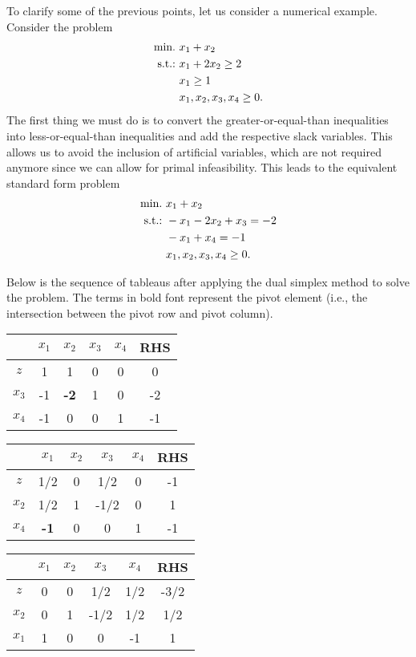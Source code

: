 To clarify some of the previous points, let us consider a numerical example. Consider the problem 
%
\begin{align*}
	\mathop{\text{min.~}} &x_1 + x_2 \\
	\mathop{\text{s.t.:~}} &x_1 + 2x_2 \geq 2 \\
	&x_1 \geq  1 \\
	&x_1,x_2,x_3,x_4 \geq 0.	
\end{align*}	
%
The first thing we must do is to convert the greater-or-equal-than inequalities into less-or-equal-than inequalities and add the respective slack variables. This allows us to avoid the inclusion of artificial variables, which are not required anymore since we can allow for primal infeasibility. This leads to the equivalent standard form problem
%
\begin{align*}
	\mathop{\text{min.~}} &x_1 + x_2 \\
	\mathop{\text{s.t.:~}} &-x_1 - 2x_2 + x_3 = -2 \\
	&-x_1 + x_4 = -1 \\
	&x_1,x_2,x_3,x_4 \geq 0.	
\end{align*}

Below is the sequence of tableaus after applying the dual simplex method to solve the problem. The terms in bold font represent the pivot element (i.e., the intersection between the pivot row and pivot column). 


\begin{center}
	\begin{tabular}{c|cccc|c}
		 & $x_1$ & $x_2$ & $x_3$ & $x_4$ & RHS \\ \hline 
		$z$  &  1 & 1 & 0 & 0 & 0  \\ \hline
	   $x_3$ & -1 &\textbf{-2} & 1 & 0 & -2 \\
	   $x_4$ & -1 & 0 & 0 & 1 & -1 \\\hline \hline
	\end{tabular}
	
	\begin{tabular}{c|cccc|c}
		 & $x_1$ & $x_2$ & $x_3$ & $x_4$ & RHS \\ \hline 
		$z$  & 1/2 & 0 & 1/2 & 0 & -1  \\ \hline
	   $x_2$ & 1/2 & 1 & -1/2 & 0 & 1 \\
	   $x_4$ & \textbf{-1} & 0 & 0 & 1 & -1 \\ \hline \hline 
	\end{tabular}
	
	\begin{tabular}{c|cccc|c}
		 & $x_1$ & $x_2$ & $x_3$ & $x_4$ & RHS \\ \hline 
		$z$  & 0 & 0 & 1/2 & 1/2 & -3/2  \\ \hline
	   $x_2$ & 0 & 1 & -1/2 & 1/2 & 1/2 \\
	   $x_1$ & 1 & 0 & 0 & -1 & 1 \\ \hline 
	\end{tabular}
\end{center}

